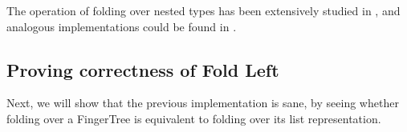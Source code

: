\documentclass[12pt,twoside,notitlepage]{report}
\begin{document}
The operation of folding over nested types has been extensively studied in \cite{nestedhinze}, and analogous implementations could be found in \cite{debrujin}.

\subsection{Proving correctness of Fold Left}

Next, we will show that the previous implementation is sane, by seeing whether folding over a FingerTree is equivalent to folding over its list representation.

\begin{code}
\\
\> \AgdaSymbol{:}  \AgdaSymbol{\{}\AgdaSymbol{\}} \AgdaSymbol{\{} \AgdaSymbol{:}  \AgdaSymbol{\}\{} \AgdaSymbol{:}  \AgdaSymbol{\}}\<%
\\
\>[2]\<[14]%
\>[14]\AgdaSymbol{\{} \AgdaSymbol{:}  \AgdaSymbol{\}}\<%
\\
\>[2]\<[14]%
\>[14]  \AgdaSymbol{:}   \<%
\\
\>[2]\<[14]%
\>[14]  \AgdaSymbol{:}    \<%
\\
\>[2]\<[14]%
\>[14] \AgdaSymbol{\{} \AgdaSymbol{:} \AgdaSymbol{\}}\<%
\\
\>[2]\<[14]%
\>[14] \AgdaSymbol{(} \AgdaSymbol{:}     \AgdaSymbol{)}\<%
\\
\>[2]\<[14]%
\>[14] \AgdaSymbol{(} \AgdaSymbol{:} \AgdaSymbol{)}\<%
\\
\>[2]\<[14]%
\>[14] \AgdaSymbol{(} \AgdaSymbol{:}    \AgdaSymbol{\{}\AgdaSymbol{\})}\<%
\\
\>[2]\<[14]%
\>[14] \AgdaSymbol{(}        \AgdaSymbol{(} \AgdaSymbol{))}\<%
\\
\end{code}
\end{document}
